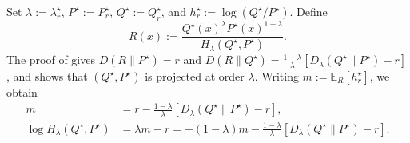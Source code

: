 \documentclass[journal,10pt,draftclsnofoot,onecolumn]{IEEEtran}
\begin{document}
\begin{IEEEproof} 
Set $\lambda:=\lambda_r^\star$, $P^\star:=P_r^\star$, $Q^\star:=Q_r^\star$, and $h_r^\star:=\log(Q^\star/P^\star)$. Define
\begin{equation*} 
R(x):= \frac{Q^\star(x)^\lambda P^\star(x)^{1-\lambda}} {H_\lambda(Q^\star,P^\star)}.
\end{equation*} 
The proof of  gives $D(R\|P^\star)=r$ and $D(R\|Q^\star)=\frac{1-\lambda}{\lambda} [D_\lambda(Q^\star\|P^\star)-r]$, and shows that $(Q^\star,P^\star)$ is projected at order $\lambda$. Writing $m:=\mathbb E_R[h_r^\star]$, we obtain 
\begin{align} m &= r-\frac{1-\lambda}{\lambda} \left[D_\lambda(Q^\star\|P^\star)-r\right], \label{eq:proof-polynomial-mean} \\ \log H_\lambda(Q^\star,P^\star) &= \lambda m-r = -(1-\lambda)m -\frac{1-\lambda}{\lambda} \left[D_\lambda(Q^\star\|P^\star)-r\right].
\label{eq:proof-polynomial-hellinger}
\end{align}
 

\end{IEEEproof}
\end{document}
